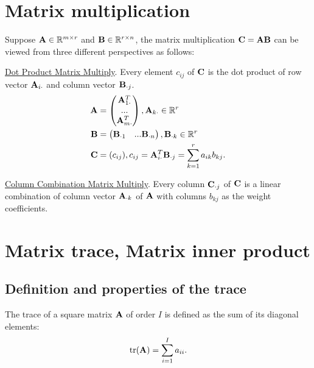 \section{Matrix multiplication}
Suppose $\bold{A}\in\mathbb{R}^{m\times r}$ and $\bold{B}\in \mathbb{R}^{r\times n}$,
the matrix multiplication $\bold{C}=\bold{A}\bold{B}$ can be viewed from
three different perspectives as follows:
\par
\underline{Dot Product Matrix Multiply}. 
Every element $c_{ij}$ of $\bold{C}$ is the 
dot product of row vector $\bold{A}_{i\cdot}$ and column vector $\bold{B}_{\cdot j}$.
\begin{align*}
    \bold{A}&=\begin{pmatrix}
        \bold{A}_{1\cdot}^T\\ ...\\\bold{A}_{m\cdot}^T
    \end{pmatrix},\bold{A}_{k\cdot}\in\mathbb{R}^r\\
    \bold{B}&=\begin{pmatrix}
        \bold{B}_{\cdot 1}&...\bold{B}_{\cdot n}
    \end{pmatrix},\bold{B}_{\cdot k}\in\mathbb{R}^r\\
    \bold{C}&=(c_{ij}),c_{ij}=\bold{A}_{i\cdot}^T\bold{B}_{\cdot j}=\sum\limits_{k=1}^{r}a_{ik}b_{kj}.
\end{align*}
\par
\underline{Column Combination Matrix Multiply}.
Every column $\bold{C}_{\cdot j}$ of $\bold{C}$ is a linear combination of column vector
$\bold{A}_{\cdot k}$ of $\bold{A}$ with columns $b_{kj}$ as the weight coefficients.






\section{Matrix trace, Matrix inner product}

\subsection{Definition and properties of the trace}
\begin{definition}{}{}
    The trace of a square matrix $\bold{A}$ of order $I$ is defined as the sum of its diagonal elements:
    \begin{align*}
        \text{tr}(\bold{A})=\sum\limits_{i=1}^{I}a_{ii}.
    \end{align*}
\end{definition}


